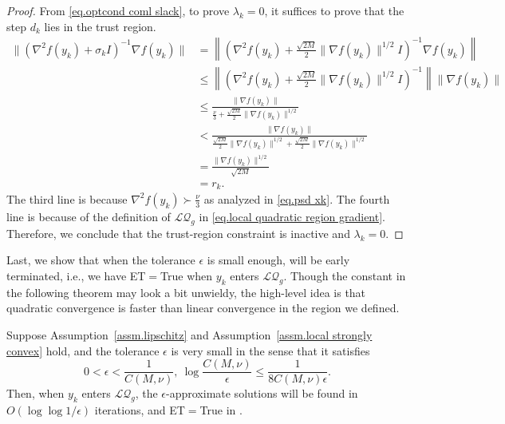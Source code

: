 \documentclass{mcom-l}
\numberwithin{equation}{section}
\begin{document}
\begin{proof}
    From \eqref{eq.optcond coml slack}, to prove $\lambda_k=0$, it suffices to prove that the step $d_k$ lies in the trust region.
    \begin{equation*}
        \begin{aligned}
            \|(\nabla^2 f(y_k)+\sigma_k I)^{-1}\nabla f(y_k)\| & = \left\|\left (\nabla^2 f(y_k)+\frac{\sqrt{2M}}{2} \|\nabla f(y_k)\|^{1/2} I\right)^{-1}\nabla f(y_k)\right\|         \\
                                                               & \leq \left\|\left (\nabla^2 f(y_k)+\frac{\sqrt{2M}}{2} \|\nabla f(y_k)\|^{1/2} I\right)^{-1}\right\| \|\nabla f(y_k)\| \\
                                                               & \leq \frac{\|\nabla f(y_k)\|}{\frac{\nu}{3}+\frac{\sqrt{2M}}{2} \|\nabla f(y_k)\|^{1/2}}                               \\
                                                               & <\frac{\|\nabla f(y_k)\|}{\frac{\sqrt{2M}}{2}\|\nabla f(y_k)\|^{1/2}+\frac{\sqrt{2M}}{2} \|\nabla f(y_k)\|^{1/2}}      \\
                                                               & =\frac{\|\nabla f(y_k)\|^{1/2}}{\sqrt{2M}}                                                                             \\
                                                               & =r_k.
        \end{aligned}
    \end{equation*}
    The third line is because $\nabla^2 f(y_k)\succ \frac{\nu}{3}$ as analyzed in \eqref{eq.psd xk}. The fourth line is because of the definition of $\mathcal{LQ}_g$ in \eqref{eq.local quadratic region gradient}. Therefore, we conclude that the trust-region constraint is inactive and $\lambda_k=0$.
\end{proof}
Last, we show that when the tolerance $\epsilon$ is small enough,  will be early terminated, i.e., we have ET$=$True when $y_k$ enters $\mathcal{LQ}_g$. Though the constant in the following theorem may look a bit unwieldy, the high-level idea is that quadratic convergence is faster than linear convergence in the region we defined.
\begin{theorem}
    \label{thm.local quadratic convergence}
    Suppose Assumption~\ref{assm.lipschitz} and Assumption~\ref{assm.local strongly convex} hold, and the tolerance $\epsilon$ is very small in the sense that it satisfies
    \begin{equation}
        \label{eq.regularity epsilon}
        0<\epsilon< \frac{1}{C(M,\nu)}, \ \log\frac{C(M,\nu)}{\epsilon}\leq \frac{1}{8C(M,\nu)\epsilon}.
    \end{equation}
    Then, when $y_k$ enters $\mathcal{LQ}_g$, the $\epsilon$-approximate solutions will be found in $O(\log\log1/\epsilon)$ iterations, and ET$=$True in .
\end{theorem}
\end{document}
